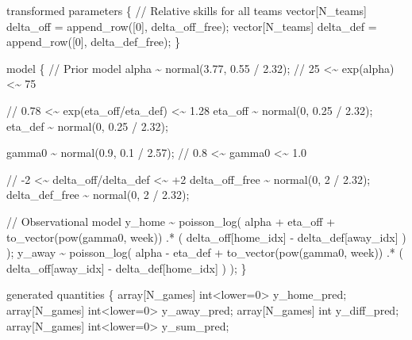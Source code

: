 \documentclass[
  letterpaper,
  DIV=11,
  numbers=noendperiod]{scrartcl}
\newenvironment{Shaded}{\begin{snugshade}}{\end{snugshade}}
\newcommand{\CommentTok}[1]{\textcolor[rgb]{0.37,0.37,0.37}{#1}}
\newcommand{\DataTypeTok}[1]{\textcolor[rgb]{0.68,0.00,0.00}{#1}}
\newcommand{\DecValTok}[1]{\textcolor[rgb]{0.68,0.00,0.00}{#1}}
\newcommand{\FloatTok}[1]{\textcolor[rgb]{0.68,0.00,0.00}{#1}}
\newcommand{\KeywordTok}[1]{\textcolor[rgb]{0.00,0.23,0.31}{#1}}
\newcommand{\NormalTok}[1]{\textcolor[rgb]{0.00,0.23,0.31}{#1}}
\begin{document}
\begin{codelisting}
\begin{Shaded}
\begin{Highlighting}[]
\KeywordTok{transformed parameters}\NormalTok{ \{}
  \CommentTok{// Relative skills for all teams}
  \DataTypeTok{vector}\NormalTok{[N\_teams] delta\_off = append\_row([}\DecValTok{0}\NormalTok{]\textquotesingle{}, delta\_off\_free);}
  \DataTypeTok{vector}\NormalTok{[N\_teams] delta\_def = append\_row([}\DecValTok{0}\NormalTok{]\textquotesingle{}, delta\_def\_free);}
\NormalTok{\}}

\KeywordTok{model}\NormalTok{ \{}
  \CommentTok{// Prior model}
\NormalTok{  alpha \textasciitilde{} normal(}\FloatTok{3.77}\NormalTok{, }\FloatTok{0.55}\NormalTok{ / }\FloatTok{2.32}\NormalTok{); }\CommentTok{// 25 \textless{}\textasciitilde{}  exp(alpha) \textless{}\textasciitilde{} 75}

  \CommentTok{// 0.78 \textless{}\textasciitilde{} exp(eta\_off/eta\_def) \textless{}\textasciitilde{} 1.28}
\NormalTok{  eta\_off \textasciitilde{} normal(}\DecValTok{0}\NormalTok{, }\FloatTok{0.25}\NormalTok{ / }\FloatTok{2.32}\NormalTok{);}
\NormalTok{  eta\_def \textasciitilde{} normal(}\DecValTok{0}\NormalTok{, }\FloatTok{0.25}\NormalTok{ / }\FloatTok{2.32}\NormalTok{);}

\NormalTok{  gamma0 \textasciitilde{} normal(}\FloatTok{0.9}\NormalTok{, }\FloatTok{0.1}\NormalTok{ / }\FloatTok{2.57}\NormalTok{); }\CommentTok{// 0.8  \textless{}\textasciitilde{} gamma0 \textless{}\textasciitilde{} 1.0}

  \CommentTok{// {-}2 \textless{}\textasciitilde{} delta\_off/delta\_def \textless{}\textasciitilde{} +2}
\NormalTok{  delta\_off\_free \textasciitilde{} normal(}\DecValTok{0}\NormalTok{, }\DecValTok{2}\NormalTok{ / }\FloatTok{2.32}\NormalTok{);}
\NormalTok{  delta\_def\_free \textasciitilde{} normal(}\DecValTok{0}\NormalTok{, }\DecValTok{2}\NormalTok{ / }\FloatTok{2.32}\NormalTok{);}

  \CommentTok{// Observational model}
\NormalTok{  y\_home \textasciitilde{} poisson\_log(  alpha + eta\_off}
\NormalTok{                       + to\_vector(pow(gamma0, week))}
\NormalTok{                         .* (  delta\_off[home\_idx]}
\NormalTok{                             {-} delta\_def[away\_idx] ) );}
\NormalTok{  y\_away \textasciitilde{} poisson\_log(  alpha {-} eta\_def}
\NormalTok{                       + to\_vector(pow(gamma0, week))}
\NormalTok{                         .* (  delta\_off[away\_idx]}
\NormalTok{                             {-} delta\_def[home\_idx] ) );}
\NormalTok{\}}

\KeywordTok{generated quantities}\NormalTok{ \{}
  \DataTypeTok{array}\NormalTok{[N\_games] }\DataTypeTok{int}\NormalTok{\textless{}}\KeywordTok{lower}\NormalTok{=}\DecValTok{0}\NormalTok{\textgreater{} y\_home\_pred;}
  \DataTypeTok{array}\NormalTok{[N\_games] }\DataTypeTok{int}\NormalTok{\textless{}}\KeywordTok{lower}\NormalTok{=}\DecValTok{0}\NormalTok{\textgreater{} y\_away\_pred;}
  \DataTypeTok{array}\NormalTok{[N\_games] }\DataTypeTok{int}\NormalTok{ y\_diff\_pred;}
  \DataTypeTok{array}\NormalTok{[N\_games] }\DataTypeTok{int}\NormalTok{\textless{}}\KeywordTok{lower}\NormalTok{=}\DecValTok{0}\NormalTok{\textgreater{} y\_sum\_pred;}


\end{Highlighting}
\end{Shaded}
\end{codelisting}
\end{document}
